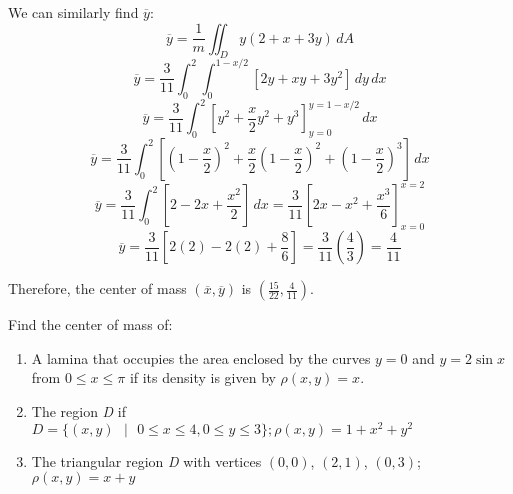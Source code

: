 We can similarly find $\overline{y}$:
$$\overline{y} = \frac{1}{m} \iint_{\textit{D}} y \left(2 + x + 3y \right)
\,dA$$
$$\overline{y} = \frac{3}{11} \int_0^2 \int_0^{1 - x/2} \left[ 2y + xy + 3y^2 
\right]\,dy\,dx$$
$$\overline{y} = \frac{3}{11} \int_0^2 \left[ y^2 + \frac{x}{2}y^2 + y^3 
\right]_{y = 0}^{y = 1 - x/2} \,dx$$
$$\overline{y} = \frac{3}{11} \int_0^2 \left[ \left(1 - \frac{x}{2} \right)^2 
+ \frac{x}{2} \left( 1 - \frac{x}{2} \right)^2 + \left( 1 - \frac{x}{2} \right)
^3 \right] \,dx$$
$$\overline{y} = \frac{3}{11} \int_0^2 \left[ 2 - 2x + \frac{x^2}{2} \right]
\,dx = \frac{3}{11} \left[ 2x - x^2 + \frac{x^3}{6} \right]_{x = 0}^{x = 2}$$
$$\overline{y} = \frac{3}{11} \left[ 2(2) - 2(2) + \frac{8}{6} \right] = \frac{
3}{11} \left( \frac{4}{3} \right) = \frac{4}{11}$$

Therefore, the center of mass $(\overline{x}, \overline{y})$ is $(\frac{15}{22
}, \frac{4}{11})$.

\begin{Exercise}[title = {Center of Mass}, label = c_of_m]
Find the center of mass of: 
\begin{enumerate}
\item A lamina that occupies the area enclosed by the 
curves $y = 0$ and $y = 2\sin{x}$ from $0 \leq x \leq \pi$ if its density is 
given by $\rho (x,y) = x$.
\item The region \textit{D} if $\textit{D} = \{(x, y)\text{ }|\text{ } 0 \leq x
\leq 4, 0 \leq y \leq 3 \}; \rho (x, y) = 1 + x^2 + y^2$
\item The triangular region \textit{D} with vertices $(0, 0)$, $(2, 1)$, 
$(0, 3)$; $\rho (x, y) = x + y$
\end{enumerate}
\vspace{100mm}
\end{Exercise}

